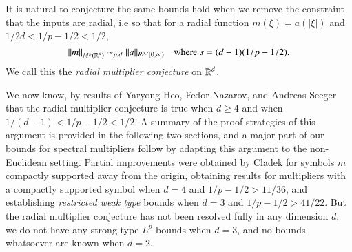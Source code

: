 

It is natural to conjecture the same bounds hold when we remove the constraint that the inputs are radial, i.e so that for a radial function $m(\xi) = a(|\xi|)$ and $1/2d < 1/p - 1/2 < 1/2$,
%
\begin{equation} \label{RadialMultiplierBound}
  \| m \|_{M^p(\operatorname{\mathbb{R}}^d)} \sim_{p,d} \| a \|_{R^{p,s}[0,\infty)} \quad\text{where $s = (d-1)(1/p - 1/2)$}.
\end{equation}
%
%
%
We call this the \emph{radial multiplier conjecture} on $\operatorname{\mathbb{R}}^d$.

We now know, by results of Yaryong Heo, Fedor Nazarov, and Andreas Seeger \cite{HeoandNazarovandSeeger} that the radial multiplier conjecture is true when $d \geq 4$ and when $1/(d-1) < 1/p - 1/2 < 1/2$. A summary of the proof strategies of this argument is provided in the following two sections, and a major part of our bounds for spectral multipliers follow by adapting this argument to the non-Euclidean setting. Partial improvements were obtained by Cladek \cite{Cladek} for symbols $m$ compactly supported away from the origin, obtaining results for multipliers with a compactly supported symbol when $d = 4$ and $1/p - 1/2 > 11/36$, and establishing \emph{restricted weak type} bounds when $d = 3$ and $1/p - 1/2 > 41/22$. But the radial multiplier conjecture has not been resolved fully in any dimension $d$, we do not have any strong type $L^p$ bounds when $d = 3$, and no bounds whatsoever are known when $d = 2$.


